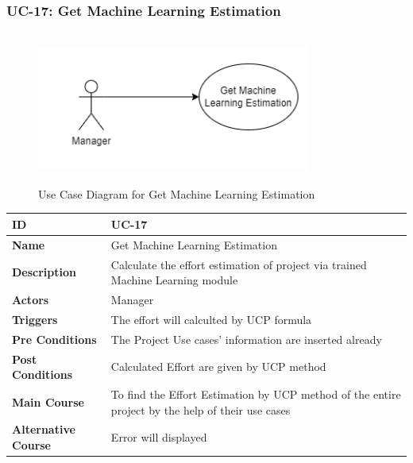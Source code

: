 \newpage

\subsubsection{UC-17: Get Machine Learning Estimation}
\begin{figure}[H]
    \includegraphics[height=5cm, width=0.8\textwidth]{./diagrams/Use Case/u17.png}
    \centering
    \caption{Use Case Diagram for Get Machine Learning Estimation}
    \label{fig:Usecase1}
\end{figure}

\begin{center}
    \begin{tabularx}{\textwidth}{|l|X|}
        \hline
        \textbf{ID}                 & UC-17                                                                                            \\
        \hline
        \textbf{Name}               & Get Machine Learning Estimation                                                                  \\
        \hline
        \textbf{Description}        & Calculate the effort estimation of project via trained Machine Learning module                   \\
        \hline
        \textbf{Actors}             & Manager                                                                                          \\
        \hline
        \textbf{Triggers}           & The effort will calculted by UCP formula                                                         \\
        \hline
        \textbf{Pre Conditions}     & The Project Use cases' information are inserted already                                          \\
        \hline
        \textbf{Post Conditions}    & Calculated Effort are given by UCP method                                                        \\
        \hline
        \textbf{Main Course}        & To find the Effort Estimation by UCP method of the entire project by the help of their use cases \\
        \hline
        \textbf{Alternative Course} & Error will displayed                                                                             \\
        \hline
    \end{tabularx}
\end{center}
\newpage


